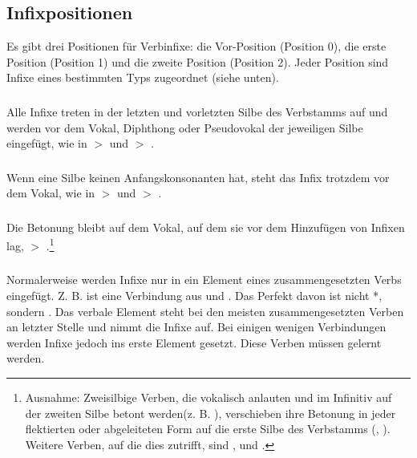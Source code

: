 \subsection{Infixpositionen} Es gibt drei Positionen für Verbinfixe: die Vor-Position (Position 0), die erste Position (Position 1) und die zweite Position (Position 2). Jeder Position sind Infixe eines bestimmten Typs zugeordnet (siehe unten).

\subsubsection{} Alle Infixe treten in der letzten und vorletzten Silbe des Verbstamms auf und werden vor dem Vokal, Diphthong oder Pseudovokal der jeweiligen Silbe eingefügt, wie in  $>$  und  $>$ .

\subsubsection{} Wenn eine Silbe keinen Anfangskonsonanten hat, steht das Infix trotzdem vor dem Vokal, wie in  $>$  und 
$>$ .

\subsubsection{} Die Betonung bleibt auf dem Vokal, auf dem sie vor dem Hinzufügen von Infixen lag,  $>$ .\footnote{Ausnahme: Zweisilbige Verben, die vokalisch anlauten und im Infinitiv auf der zweiten Silbe betont werden\linebreak (z. B. ), verschieben ihre Betonung in jeder flektierten oder abgeleiteten Form auf die erste Silbe des Verbstamms (, ). Weitere Verben, auf die dies zutrifft, sind ,  und . }

\subsubsection{} Normalerweise werden Infixe nur in ein Element eines zusammengesetzten Verbs eingefügt. Z. B. ist   eine Verbindung aus   und  . Das Perfekt davon ist nicht *, sondern . Das verbale Element steht bei den meisten zusammengesetzten Verben an letzter Stelle und nimmt die Infixe auf. Bei einigen wenigen Verbindungen werden Infixe jedoch ins erste Element gesetzt. Diese Verben müssen gelernt werden.

